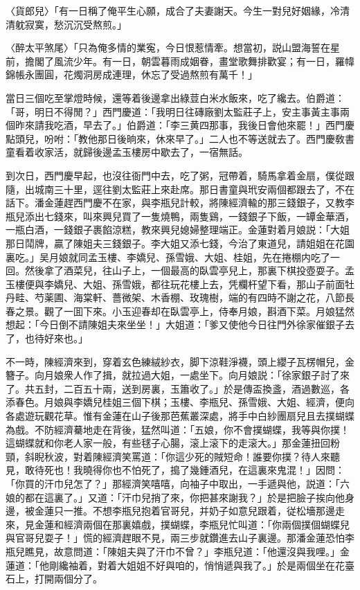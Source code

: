 〈貨郎兒〉「有一日稱了俺平生心願，成合了夫妻謝天。今生一對兒好姻緣，冷清清躭寂寞，愁沉沉受熬煎。」

〈醉太平煞尾〉「只為俺多情的業寃，今日恨惹情牽。想當初，説山盟海誓在星前，擔閣了風流少年。有一日，朝雲暮雨成姻眷，畫堂歌舞排歡宴；有一日，羅幃錦帳永團圓，花燭洞房成連理，休忘了受過熬煎有萬千！」

當日三個吃至掌燈時候，還等着後邊拿出綠荳白米水飯來，吃了纔去。伯爵道：「哥，明日不得閒？」西門慶道：「我明日往磚廠劉太監莊子上，安主事黃主事兩個昨來請我吃酒，早去了。」伯爵道：「李三黄四那事，我後日會他來罷！」西門慶點頭兒，吩咐：「教他那日後晌來，休來早了。」二人也不等送就去了。西門慶敎書童看着收家活，就歸後邊孟玉樓房中歇去了，一宿無話。

到次日，西門慶早起，也沒往衙門中去，吃了粥，冠帶着，騎馬拿着金扇，僕從跟隨，出城南三十里，逕往劉太監莊上來赴席。那日書童與玳安兩個都跟去了，不在話下。潘金蓮趕西門慶不在家，與李瓶兒計較，將陳經濟輸的那三錢銀子，又教李瓶兒添出七錢來，叫來興兒買了一隻燒鴨，兩隻鷄，一錢銀子下飯，一罈金華酒，一瓶白酒，一錢銀子裹餡涼糕，教來興兒媳婦整理端正。金蓮對着月娘説：「大姐那日鬦牌，贏了陳姐夫三錢銀子。李大姐又添七錢，今治了東道兒，請姐姐在花園裏吃。」吴月娘就同孟玉樓、李嬌兒、孫雪娥、大姐、桂姐，先在捲棚内吃了一回。然後拿了酒菜兒，往山子上，一個最高的臥雲亭兒上，那裏下棋投壺耍子。孟玉樓便與李嬌兒、大姐、孫雪娥，都往玩花樓上去，凭欄杆望下看，那山子前面牡丹畦、芍薬圃、海棠軒、薔微架、木香棚、玫瑰樹，端的有四時不謝之花，八節長春之景。觀了一囬下來。小玉迎春却在臥雲亭上，侍奉月娘，斟酒下菜。月娘猛然想起：「今日倒不請陳姐夫來坐坐！」大姐道：「爹又使他今日往門外徐家催銀子去了，也待好來也。」

不一時，陳經濟來到，穿着玄色練絨紗衣，脚下涼鞋淨襪，頭上纓子瓦楞帽兒，金簪子。向月娘衆人作了揖，就拉過大姐，一處坐下。向月娘説：「徐家銀子討了來了。共五封，二百五十兩，送到房裏，玉簫收了。」於是傳盃換盞，酒過數巡，各添春色。月娘與李嬌兒桂姐三個下棋；玉樓、李瓶兒、孫雪娥、大姐、經濟，便向各處遊玩觀花草。惟有金蓮在山子後那芭蕉叢深處，將手中白紗團扇兒且去撲蝴蝶為戲。不防經濟驀地走在背後，猛然叫道：「五娘，你不會撲蝴蝶，我等與你撲！這蝴蝶就和你老人家一般，有些毬子心腸，滚上滚下的走滚大。」那金蓮扭回粉頸，斜睨秋波，對着陳經濟笑罵道：「你這少死的賊短命！誰要你撲？待人來聽見，敢待死也！我曉得你也不怕死了，搗了幾鍾酒兒，在這裏來鬼混！」因問：「你買的汗巾兒怎了？」那經濟笑嘻嘻，向袖子中取出，一手遞與他，説道：「六娘的都在這裏了。」又道：「汗巾兒捎了來，你把甚來謝我？」於是把臉子挨向他身邊，被金蓮只一推。不想李瓶兒抱着官哥兒，并奶子如意兒跟着，従松墻那邊走來，見金蓮和經濟兩個在那裏嬉戲，撲蝴蝶，李瓶兒忙叫道：「你兩個撲個蝴蝶兒與官哥兒耍子！」慌的經濟趕眼不見，兩三步就鑽進去山子裏邊。那潘金蓮恐怕李瓶兒瞧見，故意問道：「陳姐夫與了汗巾不曾？」李瓶兒道：「他還沒與我哩。」金蓮道：「他剛纔袖着，對着大姐姐不好與咱的，悄悄遞與我了。」於是兩個坐在花臺石上，打開兩個分了。

